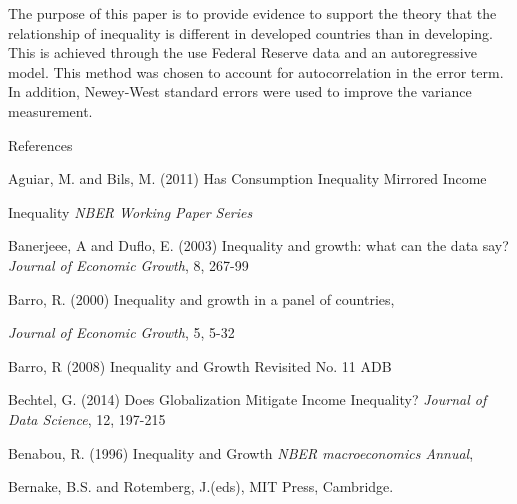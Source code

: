 \documentclass{article}
\begin{document}
\quad The purpose of this paper is to provide evidence to support the theory that the relationship of inequality is different in developed countries than in developing.  This is achieved through the use Federal Reserve data and an autoregressive model.  This method was chosen to account for autocorrelation in the error term.  In addition, Newey-West standard errors were used to improve the variance measurement.  
\quad 

\newpage








\centering References

\normalfont \flushleft

\vspace{2mm}

Aguiar, M. and Bils, M. (2011) Has Consumption Inequality Mirrored Income 
\vspace{1mm}

\quad \quad Inequality \emph{NBER Working Paper Series}

\vspace{2mm}


Banerjeee, A and Duflo, E. (2003) Inequality and growth: what can the data  
\vspace{1mm}
\quad\quad say? \emph{Journal of Economic Growth}, 8, 267-99

\vspace{1mm}

Barro, R. (2000) Inequality and growth in a panel of countries, 
\vspace{1mm}

\quad\quad\emph{Journal of Economic Growth}, 5, 5-32

\vspace{1mm}

Barro, R (2008) Inequality and Growth Revisited No. 11 ADB

\vspace{1mm}

Bechtel, G. (2014) Does Globalization Mitigate Income Inequality?
  \vspace{1mm}
\quad\quad \emph{Journal of Data Science}, 12, 197-215

Benabou, R. (1996) Inequality and Growth \emph{NBER macroeconomics Annual},

\vspace{1mm}

\quad\quad Bernake, B.S. and Rotemberg, J.(eds), MIT Press, Cambridge.
\end{document}
